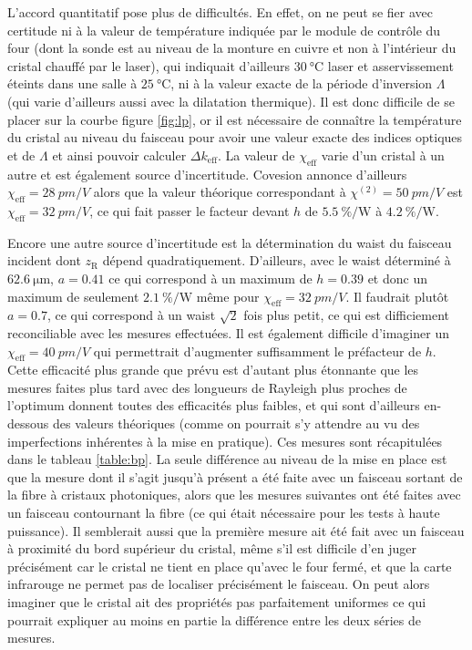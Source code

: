 \documentclass[11pt,a4paper] { article}
\newcommand{\zr}{z_\mathsc{R}}
\newcommand{\chie}{\chi_\mathsc{eff}}
\newcommand{\dke}{\Delta k_\mathsc{eff}}
\newcommand{\alphae}[1]{\SI{#1}{\percent\per\watt}}
\newcommand{\mathsc}[1]{\mathrm{\scriptscriptstyle {#1}}}
\begin{document}
L'accord quantitatif pose plus de difficultés. En effet, on ne peut se fier avec certitude ni à la valeur de température indiquée par le module de contrôle du four (dont la sonde est au niveau de la monture en cuivre et non à l'intérieur du cristal chauffé par le laser), qui indiquait d'ailleurs $\SI{30}{\celsius}$ laser et asservissement éteints dans une salle à $\SI{25}{\celsius}$, ni à la valeur exacte de la période d'inversion $\Lambda$ (qui varie d'ailleurs aussi avec la dilatation thermique). Il est donc difficile de se placer sur la courbe figure \ref{fig:lp}, or il est nécessaire de connaître la température du cristal au niveau du faisceau pour avoir une valeur exacte des indices optiques et de $\Lambda$ et ainsi pouvoir calculer $\dke$.
La valeur de $\chie$ varie d'un cristal à un autre et est également source d'incertitude. Covesion annonce d'ailleurs $\chie = \SI{28}{pm/V}$ alors que la valeur théorique correspondant à $\chi^{(2)}=\SI{50}{pm/V}$ est $\chie = \SI{32}{pm/V}$, ce qui fait passer le facteur devant $h$ de $\SI{5.5}{\percent\per\watt}$ à $\SI{4.2}{\percent\per\watt}$.

Encore une autre source d'incertitude est la détermination du waist du faisceau incident dont $\zr$ dépend quadratiquement. D'ailleurs, avec le waist déterminé à $\SI{62.6}{\micro\meter}$, $a=0.41$ ce qui correspond à un maximum de $h = 0.39$ et donc un maximum de seulement $\alphae{2.1}$ même pour $\chie = \SI{32}{pm/V}$. Il faudrait plutôt $a=0.7$, ce qui correspond à un waist $\sqrt2$ fois plus petit, ce qui est difficiement reconciliable avec les mesures effectuées. %
Il est également difficile d'imaginer un $\chie=\SI{40}{pm/V}$ qui permettrait d'augmenter suffisamment le préfacteur de $h$. Cette efficacité plus grande que prévu est d'autant plus étonnante que les mesures faites plus tard avec des longueurs de Rayleigh plus proches de l'optimum donnent toutes des efficacités plus faibles, et qui sont d'ailleurs en-dessous des valeurs théoriques (comme on pourrait s'y attendre au vu des imperfections inhérentes à la mise en pratique). Ces mesures sont récapitulées dans le tableau \ref{table:bp}. La seule différence au niveau de la mise en place est que la mesure dont il s'agit jusqu'à présent a été faite avec un faisceau sortant de la fibre à cristaux photoniques, alors que les mesures suivantes ont été faites avec un faisceau contournant la fibre (ce qui était nécessaire pour les tests à haute puissance). Il semblerait aussi que la première mesure ait été fait avec un faisceau à proximité du bord supérieur du cristal, même s'il est difficile d'en juger précisément car le cristal ne tient en place qu'avec le four fermé, et que la carte infrarouge ne permet pas de localiser précisément le faisceau. On peut alors imaginer que le cristal ait des propriétés pas parfaitement uniformes ce qui pourrait expliquer au moins en partie la différence entre les deux séries de mesures.
\end{document}
